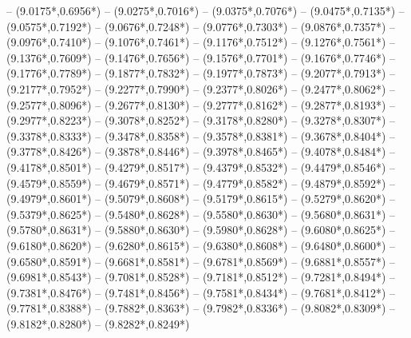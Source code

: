 {	-- ({9.0175*\dx},{0.6956*\dy})
	-- ({9.0275*\dx},{0.7016*\dy})
	-- ({9.0375*\dx},{0.7076*\dy})
	-- ({9.0475*\dx},{0.7135*\dy})
	-- ({9.0575*\dx},{0.7192*\dy})
	-- ({9.0676*\dx},{0.7248*\dy})
	-- ({9.0776*\dx},{0.7303*\dy})
	-- ({9.0876*\dx},{0.7357*\dy})
	-- ({9.0976*\dx},{0.7410*\dy})
	-- ({9.1076*\dx},{0.7461*\dy})
	-- ({9.1176*\dx},{0.7512*\dy})
	-- ({9.1276*\dx},{0.7561*\dy})
	-- ({9.1376*\dx},{0.7609*\dy})
	-- ({9.1476*\dx},{0.7656*\dy})
	-- ({9.1576*\dx},{0.7701*\dy})
	-- ({9.1676*\dx},{0.7746*\dy})
	-- ({9.1776*\dx},{0.7789*\dy})
	-- ({9.1877*\dx},{0.7832*\dy})
	-- ({9.1977*\dx},{0.7873*\dy})
	-- ({9.2077*\dx},{0.7913*\dy})
	-- ({9.2177*\dx},{0.7952*\dy})
	-- ({9.2277*\dx},{0.7990*\dy})
	-- ({9.2377*\dx},{0.8026*\dy})
	-- ({9.2477*\dx},{0.8062*\dy})
	-- ({9.2577*\dx},{0.8096*\dy})
	-- ({9.2677*\dx},{0.8130*\dy})
	-- ({9.2777*\dx},{0.8162*\dy})
	-- ({9.2877*\dx},{0.8193*\dy})
	-- ({9.2977*\dx},{0.8223*\dy})
	-- ({9.3078*\dx},{0.8252*\dy})
	-- ({9.3178*\dx},{0.8280*\dy})
	-- ({9.3278*\dx},{0.8307*\dy})
	-- ({9.3378*\dx},{0.8333*\dy})
	-- ({9.3478*\dx},{0.8358*\dy})
	-- ({9.3578*\dx},{0.8381*\dy})
	-- ({9.3678*\dx},{0.8404*\dy})
	-- ({9.3778*\dx},{0.8426*\dy})
	-- ({9.3878*\dx},{0.8446*\dy})
	-- ({9.3978*\dx},{0.8465*\dy})
	-- ({9.4078*\dx},{0.8484*\dy})
	-- ({9.4178*\dx},{0.8501*\dy})
	-- ({9.4279*\dx},{0.8517*\dy})
	-- ({9.4379*\dx},{0.8532*\dy})
	-- ({9.4479*\dx},{0.8546*\dy})
	-- ({9.4579*\dx},{0.8559*\dy})
	-- ({9.4679*\dx},{0.8571*\dy})
	-- ({9.4779*\dx},{0.8582*\dy})
	-- ({9.4879*\dx},{0.8592*\dy})
	-- ({9.4979*\dx},{0.8601*\dy})
	-- ({9.5079*\dx},{0.8608*\dy})
	-- ({9.5179*\dx},{0.8615*\dy})
	-- ({9.5279*\dx},{0.8620*\dy})
	-- ({9.5379*\dx},{0.8625*\dy})
	-- ({9.5480*\dx},{0.8628*\dy})
	-- ({9.5580*\dx},{0.8630*\dy})
	-- ({9.5680*\dx},{0.8631*\dy})
	-- ({9.5780*\dx},{0.8631*\dy})
	-- ({9.5880*\dx},{0.8630*\dy})
	-- ({9.5980*\dx},{0.8628*\dy})
	-- ({9.6080*\dx},{0.8625*\dy})
	-- ({9.6180*\dx},{0.8620*\dy})
	-- ({9.6280*\dx},{0.8615*\dy})
	-- ({9.6380*\dx},{0.8608*\dy})
	-- ({9.6480*\dx},{0.8600*\dy})
	-- ({9.6580*\dx},{0.8591*\dy})
	-- ({9.6681*\dx},{0.8581*\dy})
	-- ({9.6781*\dx},{0.8569*\dy})
	-- ({9.6881*\dx},{0.8557*\dy})
	-- ({9.6981*\dx},{0.8543*\dy})
	-- ({9.7081*\dx},{0.8528*\dy})
	-- ({9.7181*\dx},{0.8512*\dy})
	-- ({9.7281*\dx},{0.8494*\dy})
	-- ({9.7381*\dx},{0.8476*\dy})
	-- ({9.7481*\dx},{0.8456*\dy})
	-- ({9.7581*\dx},{0.8434*\dy})
	-- ({9.7681*\dx},{0.8412*\dy})
	-- ({9.7781*\dx},{0.8388*\dy})
	-- ({9.7882*\dx},{0.8363*\dy})
	-- ({9.7982*\dx},{0.8336*\dy})
	-- ({9.8082*\dx},{0.8309*\dy})
	-- ({9.8182*\dx},{0.8280*\dy})
	-- ({9.8282*\dx},{0.8249*\dy})
}
